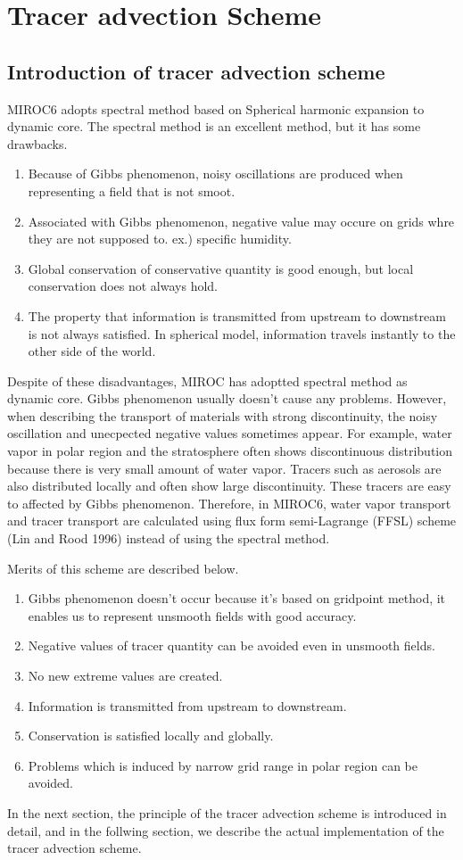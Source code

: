 \documentclass{article}
\begin{document}
\section{Tracer advection Scheme}
\subsection{Introduction of tracer advection scheme}
MIROC6 adopts spectral method based on Spherical harmonic expansion to dynamic core.
The spectral method is an excellent method, but it has some drawbacks.
\begin{enumerate}
\item Because of Gibbs phenomenon, noisy oscillations are produced when representing a field that is not smoot. 
\item Associated with Gibbs phenomenon, negative value may occure on grids whre they are not supposed to. ex.) specific humidity.
\item Global conservation of conservative quantity is good enough, but local conservation does not always hold.
\item The property that information is transmitted from upstream to downstream is not always satisfied. In spherical model, information travels instantly to the other side of the world.
\end{enumerate}
Despite of these disadvantages, MIROC has adoptted spectral method as dynamic core.
Gibbs phenomenon usually doesn't cause any problems. 
However, when describing the transport of materials with strong discontinuity, the noisy oscillation and unecpected negative values sometimes appear.
For example, water vapor in polar region and the stratosphere often shows discontinuous distribution because there is very small amount of water vapor.
Tracers such as aerosols are also distributed locally and often show large discontinuity.
These tracers are easy to affected by Gibbs phenomenon.
Therefore, in MIROC6, water vapor transport and tracer transport are calculated using flux form semi-Lagrange (FFSL) scheme (Lin and Rood 1996) instead of using the spectral method.

Merits of this scheme are described below.
\begin{enumerate}
\item Gibbs phenomenon doesn't occur because it's based on gridpoint method, it enables us to represent unsmooth fields with good accuracy. 
\item Negative values of tracer quantity can be avoided even in unsmooth fields.
\item No new extreme values are created.
\item Information is transmitted from upstream to downstream.
\item Conservation is satisfied locally and globally.
\item Problems which is induced by narrow grid range in polar region can be avoided.
\end{enumerate}
In the next section, the principle of the tracer advection scheme is introduced in detail, and in the follwing section, we describe the actual implementation of the tracer advection scheme.
\end{document}
